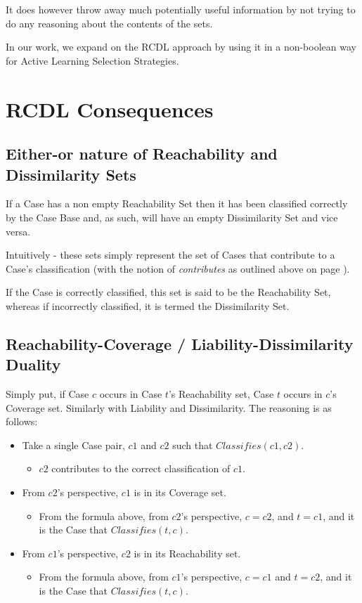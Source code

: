 \documentclass[a4paper,11pt]{report}
\begin{document}
It does however throw away much potentially useful information by not trying to do any reasoning about the contents of the sets.

In our work, we expand on the RCDL approach by using it in a non-boolean way for Active Learning Selection Strategies.

\section{RCDL Consequences}

\subsection{Either-or nature of Reachability and Dissimilarity Sets}
If a Case has a non empty Reachability Set then it has been classified correctly by the Case Base and, as such, will have an empty Dissimilarity Set and vice versa.

Intuitively - these sets simply represent the set of Cases that contribute to a Case's classification (with the notion of \emph{contributes} as outlined above on page \pageref{sec:contributes}). 

If the Case is correctly classified, this set is said to be the Reachability Set, whereas if incorrectly classified, it is termed the Dissimilarity Set.

\subsection{Reachability-Coverage / Liability-Dissimilarity Duality\label{sec:duality}}
Simply put, if Case $c$ occurs in Case $t$'s Reachability set, Case $t$ occurs in $c$'s Coverage set. Similarly with Liability and Dissimilarity.
The reasoning is as follows:
\begin{itemize}
	\item Take a single Case pair, $c1$ and $c2$ such that $Classifies(c1, c2)$.
	\begin{itemize}
		\item $c2$ contributes to the correct classification of $c1$.
	\end{itemize}
	\item From $c2$'s perspective, $c1$ is in its Coverage set.
	\begin{itemize}
		\item From the formula above, from $c2$'s perspective, $c=c2$, and $t=c1$, and it is the Case that $Classifies(t, c)$.
	\end{itemize}
	\item From $c1$'s perspective, $c2$ is in its Reachability set.
	\begin{itemize}
		\item From the formula above, from $c1$'s perspective, $c=c1$ and $t=c2$, and it is the Case that $Classifies(t, c)$.
	\end{itemize}
\end{itemize}
\end{document}
